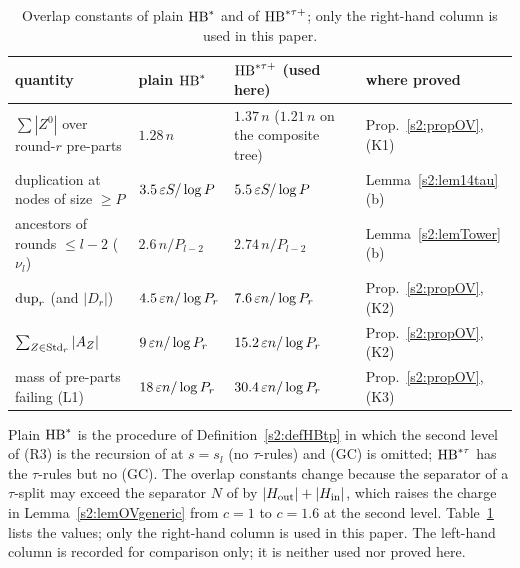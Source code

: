 \begin{table}[ht]
\begin{center}
\begin{tabular}{p{4.6cm}p{2.6cm}p{3.4cm}p{3.2cm}}
\hline
quantity & plain $\mathrm{HB}^{*}$ & $\mathrm{HB}^{*\tau{+}}$ (used here) & where proved\\
\hline
$\sum|Z^0|$ over round-$r$ pre-parts & $1.28\,n$ & $1.37\,n$ ($1.21\,n$ on
the composite tree) & Prop.~\ref{s2:propOV}, (K1)\\
duplication at nodes of size $\ge P$ & $3.5\,\varepsilon S/\log P$ &
$5.5\,\varepsilon S/\log P$ & Lemma~\ref{s2:lem14tau}(b)\\
ancestors of rounds $\le l-2$ ($\nu_l$) & $2.6\,n/P_{l-2}$ &
$2.74\,n/P_{l-2}$ & Lemma~\ref{s2:lemTower}(b)\\
$\mathrm{dup}_r$ (and $|D_r|$) & $4.5\,\varepsilon n/\log P_r$ & $7.6\,\varepsilon n/\log P_r$ &
Prop.~\ref{s2:propOV}, (K2)\\
$\sum_{Z\in\mathrm{Std}_r}|A_Z|$ & $9\,\varepsilon n/\log P_r$ & $15.2\,\varepsilon n/\log P_r$ &
Prop.~\ref{s2:propOV}, (K2)\\
mass of pre-parts failing (L1) & $18\,\varepsilon n/\log P_r$ &
$30.4\,\varepsilon n/\log P_r$ & Prop.~\ref{s2:propOV}, (K3)\\
\hline
\end{tabular}
\end{center}
\caption{Overlap constants of plain $\mathrm{HB}^{*}$ and of $\mathrm{HB}^{*\tau{+}}$; only the
right-hand column is used in this paper.}\label{s2:tabTauConstants}
\end{table}

\begin{remark}\label{s2:remTauConstants}
Plain $\mathrm{HB}^{*}$ is the procedure of Definition~\ref{s2:defHBtp} in which the
second level of (R3) is the recursion of \cite[Lemma~14]{BM} at $s=s_l$ (no
$\tau$-rules) and (GC) is omitted; $\mathrm{HB}^{*\tau}$ has the $\tau$-rules but no (GC). The
overlap constants change because the separator of a $\tau$-split may exceed
the separator $N$ of \cite{BM} by $|H_{\mathrm{out}}|+|H_{\mathrm{in}}|$, which raises the charge in
Lemma~\ref{s2:lemOVgeneric} from $c=1$ to $c=1.6$ at the second level.
Table~\ref{s2:tabTauConstants} lists the values; only the right-hand column is
used in this paper. The left-hand column is recorded for comparison only;
it is neither used nor proved here.
\deps{\ref{s2:propOV}, \ref{s2:lem14tau}, \ref{s2:lemTower}, \ref{s2:defHBtp}, \ref{s2:lemOVgeneric}}
\end{remark}

